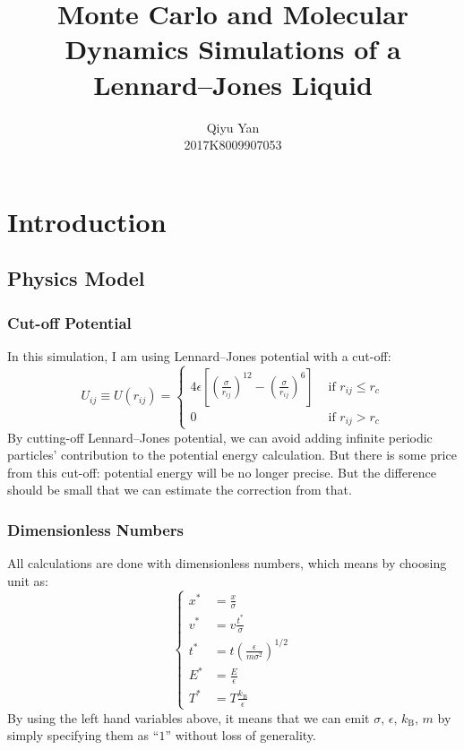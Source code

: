 \documentclass[UTF8,a4paper]{article}
\title{Monte Carlo and Molecular Dynamics Simulations of a Lennard–Jones Liquid}
\author{Qiyu Yan\\ \small{2017K8009907053}}
\begin{document}
\maketitle

\tableofcontents
\section{Introduction}
\subsection{Physics Model}
\subsubsection{Cut-off Potential}
In this simulation, I am using Lennard–Jones potential with a cut-off:
\begin{equation}
	U_{i j} \equiv U\left(r_{i j}\right)=\left\{
	\begin{array}{cc}4 \epsilon\left[\left(\frac{\sigma}{r_{i j}}\right)^{12}-\left(\frac{\sigma}{r_{i j}}\right)^{6}\right] & \text { if } r_{i j} \leq r_{c} \\
		0                                                                                                           & \text { if } r_{i j}>r_{c}\end{array}
	\right.
	\label{eqn:l-j}
\end{equation}
By cutting-off Lennard–Jones potential, we can avoid adding infinite periodic particles' contribution to the potential energy calculation.
But there is some price from this cut-off: potential energy will be no longer precise. But the difference should be small that we can estimate the
correction from that.
\subsubsection{Dimensionless Numbers}
All calculations are done with dimensionless numbers, which means by choosing unit as:
\begin{equation}
	\left\{
	\begin{aligned}
		x^{*} & = \frac{x}{\sigma}                                   \\
		v^{*} & = v\frac{t^{*}}{\sigma}                              \\
		t^{*} & = t\left(\frac{\epsilon}{m \sigma^{2}} \right)^{1/2} \\
		E^{*} & = \frac{E}{\epsilon}                                 \\
		T^{*} & = T \frac{k_{\text{B}}}{\epsilon}
	\end{aligned}
	\right.
\end{equation}
By using the left hand variables above, it means that we can emit $\sigma, \, \epsilon, \, k_\text{B}, \, m$ by simply specifying them as ``$1$''
without loss of generality.
\end{document}
